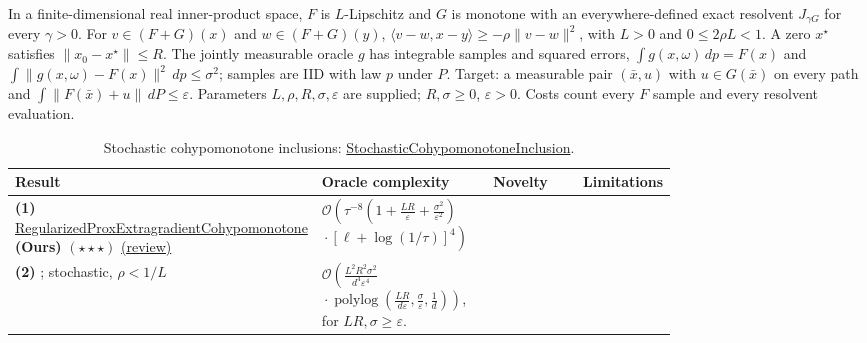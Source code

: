\begin{table}[tp]
\centering
\caption{Stochastic cohypomonotone inclusions: \href{https://github.com/k3nfalt/longtails/blob/main/LongTails/Setups/StochasticCohypomonotoneInclusion.lean}{StochasticCohypomonotoneInclusion}.}\label{tab:StochasticCohypomonotoneInclusion}
\parbox{\linewidth}{\footnotesize In a finite-dimensional real inner-product space, $F$ is $L$-Lipschitz and $G$ is monotone with an everywhere-defined exact resolvent $J_{\gamma G}$ for every $\gamma>0$. For $v\in(F+G)(x)$ and $w\in(F+G)(y)$, $\langle v-w,x-y\rangle\ge-\rho\|v-w\|^2$, with $L>0$ and $0\le2\rho L<1$. A zero $x^\star$ satisfies $\|x_0-x^\star\|\le R$. The jointly measurable oracle $g$ has integrable samples and squared errors, $\int g(x,\omega)\,dp=F(x)$ and $\int\|g(x,\omega)-F(x)\|^2\,dp\le\sigma^2$; samples are IID with law $p$ under $P$. Target: a measurable pair $(\bar x,u)$ with $u\in G(\bar x)$ on every path and $\int\|F(\bar x)+u\|\,dP\le\varepsilon$. Parameters $L,\rho,R,\sigma,\varepsilon$ are supplied; $R,\sigma\ge0$, $\varepsilon>0$. Costs count every $F$ sample and every resolvent evaluation.}\par\smallskip
\begin{threeparttable}
\footnotesize
\setlength{\tabcolsep}{4pt}\renewcommand{\arraystretch}{1.25}
\begin{tabularx}{\linewidth}{@{}>{\raggedright\arraybackslash}p{0.20\linewidth}>{\raggedright\arraybackslash}p{0.32\linewidth}>{\raggedright\arraybackslash}p{0.25\linewidth}>{\raggedright\arraybackslash}X@{}}
\toprule
\textbf{Result} & \textbf{Oracle complexity} & \textbf{Novelty} & \textbf{Limitations} \\
\midrule
\textbf{(1)} \href{https://github.com/k3nfalt/longtails/blob/main/LongTails/Theorems/RegularizedProxExtragradientCohypomonotone.lean}{Regularized\allowbreak Prox\allowbreak Extragradient\allowbreak Cohypomonotone} \textbf{(Ours)} $(\star\star\star)$ \href{https://github.com/k3nfalt/longtails/blob/main/scripts/reviews/RegularizedProxExtragradientCohypomonotone.md}{(review)}
& $\mathcal{O}\!\left(\tau^{-8}\left(1+\frac{LR}{\varepsilon}+\frac{\sigma^2}{\varepsilon^2}\right)\right.$\newline
$\left.{}\cdot\left[\ell+\log(1/\tau)\right]^4\right)$
& & \\
\midrule[1.2pt]
\textbf{(2)} \citep[Cor.~4.1, Rem.~C.7]{cohypAKWv3}; stochastic, $\rho<1/L$
& $\mathcal{O}\!\left(\frac{L^2R^2\sigma^2}{d^4\varepsilon^4}\right.$\newline
$\left.{}\cdot\operatorname{polylog}\!\left(\frac{LR}{d\varepsilon},\frac{\sigma}{\varepsilon},\frac1d\right)\right)$, for $LR,\sigma\ge\varepsilon$.

\end{tabularx}
\end{threeparttable}
\end{table}
